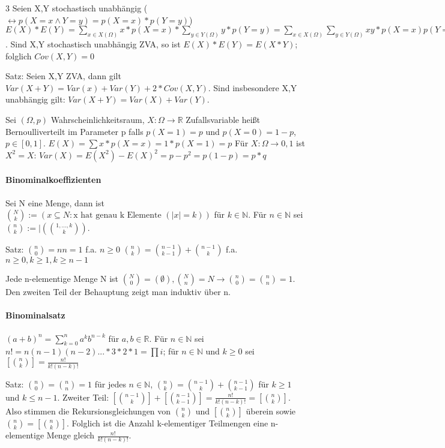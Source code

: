 \documentclass[10pt,landscape]{article}
\begin{document}
\begin{multicols}{3}
Seien X,Y stochastisch unabhängig ($\leftrightarrow p(X=x \wedge Y=y)=p(X=x)*p(Y=y)$)
$E(X)*E(Y)=\sum_{x\in X(\Omega)} x*p(X=x)* \sum_{y\in Y(\Omega)} y*p(Y=y)=\sum_{x\in X(\Omega)} \sum_{y\in Y(\Omega)} xy*p(X=x)p(Y=y)=\sum_{Z\in\mathbb{R}} z*p(X*Y=Z) = E(X*Y)$. 
Sind X,Y stochastisch unabhängig ZVA, so ist $E(X)*E(Y)=E(X*Y)$; folglich $Cov(X,Y)=0$

Satz: Seien X,Y ZVA, dann gilt $Var(X+Y)=Var(x)+Var(Y)+2*Cov(X,Y)$. Sind insbesondere X,Y unabhängig gilt: $Var(X+Y)=Var(X)+Var(Y)$.

Sei $(\Omega, p)$ Wahrscheinlichkeitsraum, $X:\Omega\rightarrow \mathbb{R}$ Zufallsvariable heißt Bernoulliverteilt im Parameter p falls $p(X=1)=p$ und $p(X=0)=1-p$, $p\in [0,1]$. $E(X)=\sum x*p(X=x)= 1*p(X=1)=p$
Für $X:\Omega\rightarrow {0,1}$ ist $X^2=X$: $Var(X)=E(X^2)-E(X)^2 = p-p^2 = p(1-p)=p*q$

\paragraph{Binominalkoeffizienten}
Sei N eine Menge, dann ist $\binom{N}{k} := (x \subseteq N: \text{x hat genau k Elemente } (|x|=k) )$ für $k\in \mathbb{N}$. Für $n\in \mathbb{N}$ sei $\binom{n}{k}:=|(\binom{1,...,k}{k})$.

Satz: $\binom{n}{0}={n}{n}=1$ f.a. $n\geq 0$ $\binom{n}{k}=\binom{n-1}{k-1}+\binom{n-1}{k}$ f.a. $n\geq 0,k\geq 1, k\geq n-1$

Jede n-elementige Menge N ist $\binom{N}{0}=(\emptyset), \binom{N}{n}={N}\rightarrow \binom{n}{0}=\binom{n}{n}=1$. Den zweiten Teil der Behauptung zeigt man induktiv über n.

\paragraph{Binominalsatz}
$(a+b)^n = \sum_{k=0}^n a^k b^{n-k}$ für $a,b\in \mathbb{R}$. 
Für $n\in \mathbb{N}$ sei $n!=n(n-1)(n-2)...*3*2*1=\prod i$; für $n\in\mathbb{N}$ und $k\geq 0$ sei $[\binom{n}{k}]=\frac{n!}{k!(n-k)!}$

Satz: $\binom{n}{0}=\binom{n}{n}=1$ für jedes $n\in\mathbb{N}$, $\binom{n}{k}=\binom{n-1}{k}+\binom{n-1}{k-1}$ für $k\geq 1$ und $k\leq n-1$.
Zweiter Teil: $[\binom{n-1}{k}]+[\binom{n-1}{k-1}]=\frac{n!}{k!(n-k)!} = [\binom{n}{k}]$. Also stimmen die Rekursionsgleichungen von $\binom{n}{k}$ und $[\binom{n}{k}]$ überein sowie $\binom{n}{k}=[\binom{n}{k}]$. Folglich ist die Anzahl k-elementiger Teilmengen eine n-elementige Menge gleich $\frac{n!}{k!(n-k)!}$.


\end{multicols}
\end{document}
